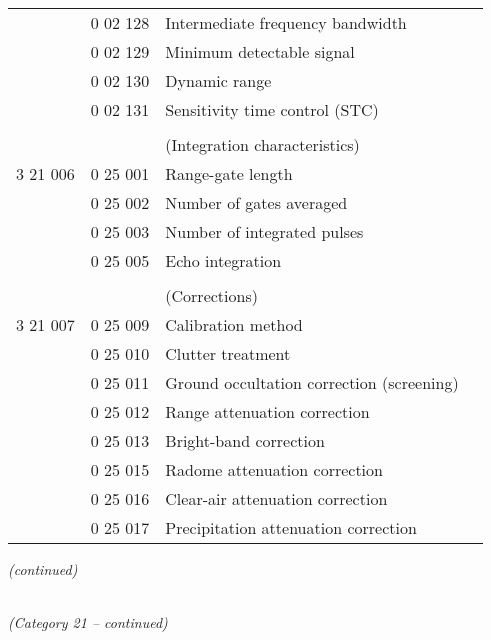 \begin{longtable}[]{@{}llll@{}}
& 0 02 128 & Intermediate frequency bandwidth &\tabularnewline
& 0 02 129 & Minimum detectable signal &\tabularnewline
& 0 02 130 & Dynamic range &\tabularnewline
& 0 02 131 & Sensitivity time control (STC) &\tabularnewline
& & &\tabularnewline
& & (Integration characteristics) &\tabularnewline
3 21 006 & 0 25 001 & Range-gate length &\tabularnewline
& 0 25 002 & Number of gates averaged &\tabularnewline
& 0 25 003 & Number of integrated pulses &\tabularnewline
& 0 25 005 & Echo integration &\tabularnewline
& & &\tabularnewline
& & (Corrections) &\tabularnewline
3 21 007 & 0 25 009 & Calibration method &\tabularnewline
& 0 25 010 & Clutter treatment &\tabularnewline
& 0 25 011 & Ground occultation correction (screening) &\tabularnewline
& 0 25 012 & Range attenuation correction &\tabularnewline
& 0 25 013 & Bright-band correction &\tabularnewline
& 0 25 015 & Radome attenuation correction &\tabularnewline
& 0 25 016 & Clear-air attenuation correction &\tabularnewline
& 0 25 017 & Precipitation attenuation correction &\tabularnewline
\bottomrule
\end{longtable}

\emph{(continued)}

\emph{\\
(Category 21 -- continued)}


